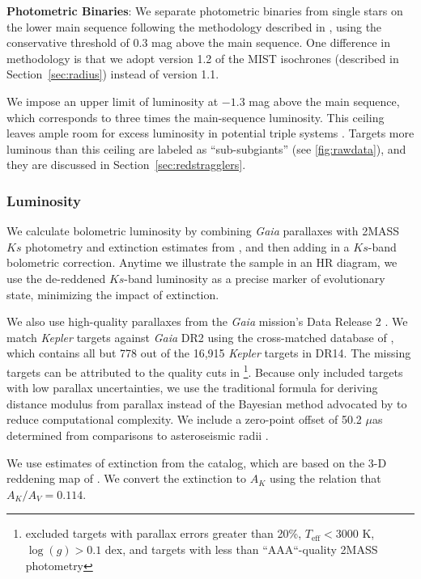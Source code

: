 \documentclass[preprint2]{aastex62}
\newcommand{\Kepler}{\mbox{\textit{Kepler}}}
\newcommand{\Gaia}{\mbox{\textit{Gaia}}}
\newcommand{\Teff}{\ensuremath{T_{\textrm{eff}}}}
\newcommand{\logg}{\ensuremath{\log(g)}}
\newcommand{\Ks}{\ensuremath{Ks}}
\begin{document}
\textbf{Photometric Binaries}: We separate photometric binaries from single stars on the lower main sequence
following the methodology described in \citet{Simonian19}, using the
conservative threshold of 0.3 mag above the main sequence. One
difference in methodology is that we adopt version 1.2 of the MIST isochrones
(described in Section~\ref{sec:radius}) instead of version 1.1.

We impose an upper limit of luminosity at \(-1.3\) mag above the main sequence,
which corresponds to three times the main-sequence luminosity. This ceiling
leaves ample room for excess luminosity in potential triple systems 
\citep{Simonian19}. Targets more luminous than this
ceiling are labeled as ``sub-subgiants'' (see \cref{fig:rawdata}), and they are
discussed in Section~\ref{sec:redstragglers}.

\subsubsection{Luminosity}
\label{sec:luminosity}

We calculate bolometric luminosity by combining \Gaia{} parallaxes
with 2MASS \Ks{} photometry \citep{Skrutskie06} and extinction estimates from 
\citet{Berger18b},
and then adding in a \Ks-band bolometric correction. Anytime we illustrate the sample 
in an HR diagram, we use the de-reddened \Ks-band luminosity as a precise marker 
of evolutionary state, minimizing the impact of extinction. 


We also use high-quality parallaxes from the \Gaia{} mission's Data
Release 2 \citep{Gaia18}. We match \Kepler{} targets against \Gaia{} DR2 using
the cross-matched database of \citet{Berger18b}, which contains all but 778 out 
of the 16,915 \Kepler{} targets in DR14. The missing targets can be attributed to 
the quality cuts in \citet{Berger18b}\footnote{\citet{Berger18b} excluded targets with parallax errors greater than 20\%, \(\Teff < 3000\) K, \(\logg > 0.1\) dex, and targets with less than ``AAA``-quality 2MASS photometry}. Because
\citet{Berger18b} only included targets with low parallax uncertainties, we use the traditional formula 
for deriving distance modulus from parallax instead of the Bayesian method 
advocated by \citet{Luri18} to reduce computational complexity. We include a 
zero-point offset of 50.2 \(\mu\)as determined from comparisons to 
asteroseismic radii \citep{Zinn19}.


We use estimates of extinction from the \citet{Berger18b} catalog, which are
based on the 3-D reddening map of
\citet{Green18}. We convert the extinction to \(A_K\) using the 
\citet{Cardelli89} relation that \(A_K/A_V = 0.114\). 
\end{document}
